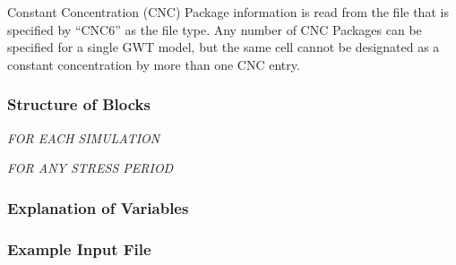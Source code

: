 Constant Concentration (CNC) Package information is read from the file that is specified by ``CNC6'' as the file type.  Any number of CNC Packages can be specified for a single GWT model, but the same cell cannot be designated as a constant concentration by more than one CNC entry. 

\vspace{5mm}
\subsubsection{Structure of Blocks}
\vspace{5mm}

\noindent \textit{FOR EACH SIMULATION}


\vspace{5mm}
\noindent \textit{FOR ANY STRESS PERIOD}

\packageperioddescription

\vspace{5mm}
\subsubsection{Explanation of Variables}
\begin{description}

\end{description}

\vspace{5mm}
\subsubsection{Example Input File}


